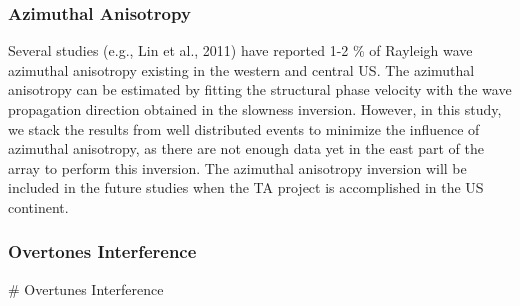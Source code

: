 \documentclass[referee]{gji}
\begin{document}
\subsubsection{Azimuthal Anisotropy}

Several studies (e.g., Lin et al., 2011) have reported 1-2 \% of Rayleigh wave azimuthal anisotropy existing in the western and central US. The azimuthal anisotropy can be estimated by fitting the structural phase velocity with the wave propagation direction obtained in the slowness inversion. However, in this study, we stack the results from well distributed events to minimize the influence of azimuthal anisotropy, as there are not enough data yet in the east part of the array to perform this inversion. The azimuthal anisotropy inversion will be included in the future studies when the TA project is accomplished in the US continent.

\subsubsection{Overtones Interference}
\label{sec:overtone}

# Overtunes Interference
\end{document}
